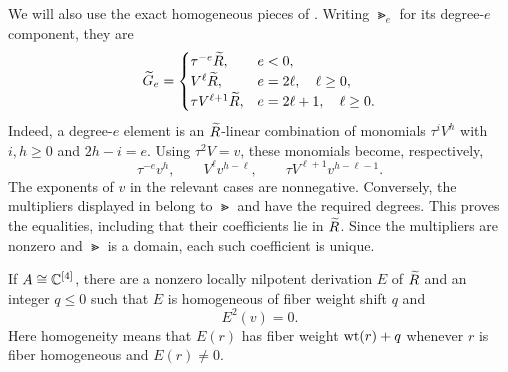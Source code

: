 We will also use the exact homogeneous pieces of .
Writing $\Gt_e$ for its degree-$e$ component, they are
\begin{equation}\label{red:pieces}
  \widetilde G_e=
  \begin{cases}
    \tau^{-e}\widetilde R, & e<0,\\
    V^\ell\widetilde R, & e=2\ell,\quad \ell\ge0,\\
    \tau V^{\ell+1}\widetilde R, & e=2\ell+1,\quad \ell\ge0.
  \end{cases}
\end{equation}
Indeed, a degree-$e$ element is an $\widetilde R$-linear combination of monomials
$\tau^iV^h$ with $i,h\ge0$ and $2h-i=e$.  Using $\tau^2V=v$,
these monomials become, respectively,
\[
  \tau^{-e}v^h,\qquad
  V^\ell v^{h-\ell},\qquad
  \tau V^{\ell+1}v^{h-\ell-1}.
\]
The exponents of $v$ in the relevant cases are nonnegative.  Conversely,
the multipliers displayed in  belong to $\Gt$ and have
the required degrees.  This proves the equalities, including that their
coefficients lie in $\widetilde R$.  Since the multipliers are nonzero and $\Gt$
is a domain, each such coefficient is unique.

\begin{proposition}\label{prop:extracted-lnd}
If $A\cong\mathbb C^{[4]}$, there are a nonzero locally nilpotent derivation
$E$ of $\widetilde R$ and an integer $q\le0$ such that $E$ is homogeneous of
fiber weight shift $q$ and
\[
  E^2(v)=0.
\]
Here homogeneity means that $E(r)$ has fiber weight $\operatorname{wt}(r)+q$ whenever
$r$ is fiber homogeneous and $E(r)\ne0$.
\end{proposition}

